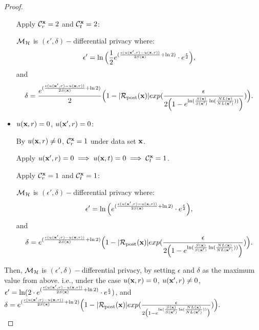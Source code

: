 \documentclass{article}
\begin{document}
\begin{proof}
\begin{itemize}
      Apply  $\mathcal{C}^{\textbf{x}}_{r} = 2$ and  $\mathcal{C}^{\textbf{x}}_{t} = 2$:

      $\mathcal{M}_{\mathcal{H}}$ is $(\epsilon', \delta)-$differential privacy where:
      $$
      \epsilon' = \ln \Big( \frac{1}{2} e^{(\frac{\epsilon (u(\textbf{x}', {r}) - u(\textbf{x}, {r}))}{2 S(\textbf{x})} + \ln 2)} \cdot e^{\frac{\epsilon}{2}} \Big),
      $$ and
      $$
      \delta = \frac{e^{(\frac{\epsilon (u(\textbf{x}', {r}) - u(\textbf{x}, {r}))}{2 S(\textbf{x})} + \ln 2)}}{2}
      \Big( 1 - |\mathcal{R}_{\textup{post}}(\textbf{x})|exp(\frac{\epsilon}{2 \Big( 1 - e ^ {\ln(\frac{S(\textbf{x})}{S(\textbf{x}')} \ln(\frac{NL(\textbf{x})}{NL(\textbf{x}')}))} \Big)}) \Big).
      $$ 

    \item {\boldmath$u(\textbf{x}, {r}) = 0$, $u(\textbf{x}', {r}) = 0$}:

      By $u(\textbf{x}, {r}) \neq 0$, $\mathcal{C}^{\textbf{x}}_{r} = 1$ under data set $\textbf{x}$.
      
      Apply $u(\textbf{x}', {r}) = 0 \implies u(\textbf{x}, {t}) = 0 \implies \mathcal{C}^{\textbf{x}}_{t} = 1$.

      Apply  $\mathcal{C}^{\textbf{x}}_{r} = 1$ and  $\mathcal{C}^{\textbf{x}}_{t} = 1$:

      $\mathcal{M}_{\mathcal{H}}$ is $(\epsilon', \delta)-$differential privacy where:
      $$
      \epsilon' = \ln \Big( e^{(\frac{\epsilon (u(\textbf{x}', {r}) - u(\textbf{x}, {r}))}{2 S(\textbf{x})} + \ln 2)} \cdot e^{\frac{\epsilon}{2}} \Big),
      $$ and
      $$
      \delta = e^{(\frac{\epsilon (u(\textbf{x}', {r}) - u(\textbf{x}, {r}))}{2 S(\textbf{x})} + \ln 2)}
      \Big( 1 - |\mathcal{R}_{\textup{post}}(\textbf{x})|exp(\frac{\epsilon}{2 \Big( 1 - e ^ {\ln(\frac{S(\textbf{x})}{S(\textbf{x}')} \ln(\frac{NL(\textbf{x})}{NL(\textbf{x}')}))} \Big)}) \Big).
      $$ 

  \end{itemize}

	
      Then, $\mathcal{M}_{\mathcal{H}}$ is $(\epsilon', \delta)-$differential privacy, by setting $\epsilon $ and $\delta$ as the maximum value from above.
      i.e., under the case {\boldmath$u(\textbf{x}, {r}) = 0$, $u(\textbf{x}', {r}) \neq 0$}, 
      $
      \epsilon' = \ln (2 \cdot e^{(\frac{\epsilon (u(\textbf{x}', {r}) - u(\textbf{x}, {r}))}{2 S(\textbf{x})} + \ln 2)} \cdot e^{\frac{\epsilon}{2}})
      $, and
      $
      \delta = e^{(\frac{\epsilon (u(\textbf{x}', {r}) - u(\textbf{x}, {r}))}{2 S(\textbf{x})} + \ln 2)}
      \Big( 1 - |\mathcal{R}_{\textup{post}}(\textbf{x})|exp(\frac{\epsilon}{2 \big(1 - e ^ {\ln(\frac{S(\textbf{x})}{S(\textbf{x}')} \ln(\frac{NL(\textbf{x})}{NL(\textbf{x}')}))} \big)}) \Big).
      $\\

\end{proof}
\end{document}
